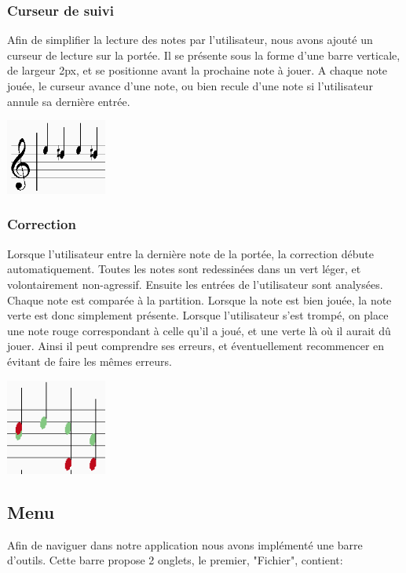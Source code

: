 \documentclass{article}
\begin{document}
\subsubsection{Curseur de suivi}
Afin de simplifier la lecture des notes par l'utilisateur, nous avons ajouté un curseur de lecture sur la portée. Il se présente sous la forme d'une barre verticale, de largeur 2px, et se positionne avant la prochaine note à jouer. A chaque note jouée, le curseur avance d'une note, ou bien recule d'une note si l'utilisateur annule sa dernière entrée. 
\begin{center}
\includegraphics[width = 125px]{./images/scroller.png}
\end{center}
\subsubsection{Correction}
Lorsque l'utilisateur entre la dernière note de la portée, la correction débute automatiquement. Toutes les notes sont redessinées dans un vert léger, et volontairement non-agressif. Ensuite les entrées de l'utilisateur sont analysées. Chaque note est comparée à la partition. Lorsque la note est bien jouée, la note verte est donc simplement présente. Lorsque l'utilisateur s'est trompé, on place une note rouge correspondant à celle qu'il a joué, et une verte là où il aurait dû jouer. Ainsi il peut comprendre ses erreurs, et éventuellement recommencer en évitant de faire les mêmes erreurs. 
\begin{center}
\includegraphics[width = 125px]{./images/correct.png}
\end{center}
\subsection{Menu}
Afin de naviguer dans notre application nous avons implémenté une barre d'outils. Cette barre propose 2 onglets, le premier, "Fichier", contient:
\end{document}
